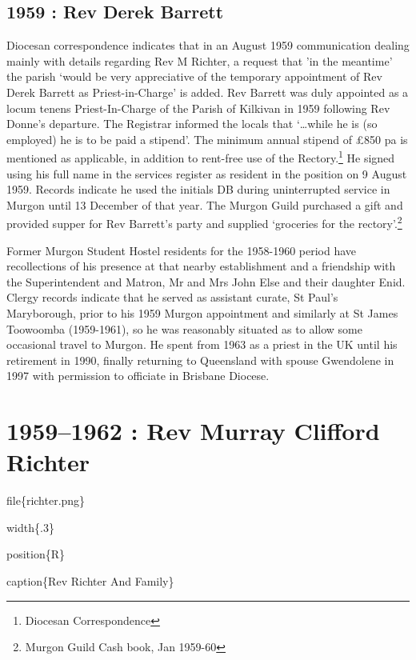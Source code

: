 \hypertarget{rev-derek-barrett}{%
\section{1959 : Rev Derek Barrett}\label{rev-derek-barrett}}

Diocesan correspondence indicates that in an August 1959 communication
dealing mainly with details regarding Rev M Richter, a request that 'in
the meantime' the parish `would be very appreciative of the temporary
appointment of Rev Derek Barrett as Priest-in-Charge' is added. Rev
Barrett was duly appointed as a locum tenens Priest-In-Charge of the
Parish of Kilkivan in 1959 following Rev Donne's departure. The
Registrar informed the locals that `\ldots while he is (so employed) he
is to be paid a stipend'. The minimum annual stipend of £850 pa is
mentioned as applicable, in addition to rent-free use of the
Rectory.\footnote{Diocesan Correspondence} He signed using his full name
in the services register as resident in the position on 9 August 1959.
Records indicate he used the initials DB during uninterrupted service in
Murgon until 13 December of that year. The Murgon Guild purchased a gift
and provided supper for Rev Barrett's party and supplied `groceries for
the rectory'.\footnote{Murgon Guild Cash book, Jan 1959-60}

Former Murgon Student Hostel residents for the 1958-1960 period have
recollections of his presence at that nearby establishment and a
friendship with the Superintendent and Matron, Mr and Mrs John Else and
their daughter Enid. Clergy records indicate that he served as assistant
curate, St Paul's Maryborough, prior to his 1959 Murgon appointment and
similarly at St James Toowoomba (1959-1961), so he was reasonably
situated as to allow some occasional travel to Murgon. He spent from
1963 as a priest in the UK until his retirement in 1990, finally
returning to Queensland with spouse Gwendolene in 1997 with permission
to officiate in Brisbane Diocese.

\hypertarget{rev-murray-clifford-richter}{%
\chapter{1959--1962 : Rev Murray Clifford
Richter}\label{rev-murray-clifford-richter}}

file\{richter.png\}

width\{.3\}

position\{R\}

caption\{Rev Richter And Family\}

